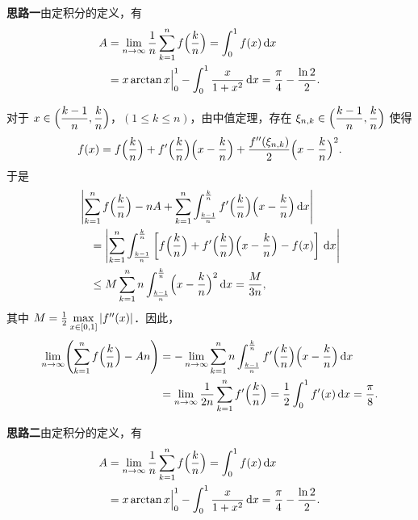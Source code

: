 \begin{solution}
\textbf{思路一}\quad 由定积分的定义，有
\begin{align*}
  A&=\lim_{n\to\infty}\frac1n\sum_{k=1}^{n}f\Bigl(\frac{k}{n}\Bigr)=\int_0^1 f(x)\,\mathrm{d} x\\
   &=x\arctan x\Big|_0^1-\int_0^1\frac{x}{1+x^2}\,\mathrm{d} x=\frac{\pi}{4}-\frac{\ln 2}{2}.
\end{align*}

对于 $x\in\Bigl(\dfrac{k-1}{n},\dfrac{k}{n}\Bigr)$，$(1\le k\le n)$，由中值定理，存在 $\xi_{n,k}\in\Bigl(\dfrac{k-1}{n},\dfrac{k}{n}\Bigr)$ 使得
\[
  f(x)=f\Bigl(\frac{k}{n}\Bigr)+f'\Bigl(\frac{k}{n}\Bigr)\Bigl(x-\frac{k}{n}\Bigr)
  +\frac{f''(\xi_{n,k})}{2}\Bigl(x-\frac{k}{n}\Bigr)^2 .
\]
于是
\begin{align*}
  &\left|\sum_{k=1}^{n}f\Bigl(\frac{k}{n}\Bigr)-nA
  +\sum_{k=1}^{n}\int_{\frac{k-1}{n}}^{\frac{k}{n}}f'\Bigl(\frac{k}{n}\Bigr)\Bigl(x-\frac{k}{n}\Bigr)\,\mathrm{d} x\right|\\
  &\quad=\left|\sum_{k=1}^{n}\int_{\frac{k-1}{n}}^{\frac{k}{n}}
  \left[f\Bigl(\frac{k}{n}\Bigr)+f'\Bigl(\frac{k}{n}\Bigr)\Bigl(x-\frac{k}{n}\Bigr)-f(x)\right]\,\mathrm{d} x\right|\\
  &\quad\le M\sum_{k=1}^{n}n\int_{\frac{k-1}{n}}^{\frac{k}{n}}\Bigl(x-\frac{k}{n}\Bigr)^2\,\mathrm{d} x=\frac{M}{3n},
\end{align*}
其中 $M=\frac12\max\limits_{x\in[0,1]}\left|f''(x)\right|$．因此，
\begin{align*}
  \lim_{n\to\infty}\Biggl(\sum_{k=1}^{n}f\Bigl(\frac{k}{n}\Bigr)-An\Biggr)
  &=-\lim_{n\to\infty}\sum_{k=1}^{n}n\int_{\frac{k-1}{n}}^{\frac{k}{n}}f'\Bigl(\frac{k}{n}\Bigr)\Bigl(x-\frac{k}{n}\Bigr)\,\mathrm{d} x\\
  &=\lim_{n\to\infty}\frac{1}{2n}\sum_{k=1}^{n}f'\Bigl(\frac{k}{n}\Bigr)
  =\frac12\int_0^1 f'(x)\,\mathrm{d} x=\frac{\pi}{8}.
\end{align*}

\textbf{思路二}\quad 由定积分的定义，有
\begin{align*}
  A&=\lim_{n\to\infty}\frac1n\sum_{k=1}^{n}f\Bigl(\frac{k}{n}\Bigr)=\int_0^1 f(x)\,\mathrm{d} x\\
   &=x\arctan x\Big|_0^1-\int_0^1\frac{x}{1+x^2}\,\mathrm{d} x=\frac{\pi}{4}-\frac{\ln 2}{2}.
\end{align*}


\end{solution}
